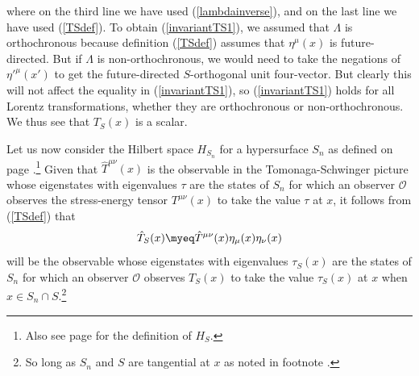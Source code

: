 \documentclass[12pt]{report}
\begin{document}
where on the third line we have used (\ref{lambdainverse}), and on the last line we have used (\ref{TSdef}). To obtain (\ref{invariantTS1}), we assumed that $\Lambda$ is orthochronous because definition (\ref{TSdef}) assumes that $\eta^\mu(x)$ is future-directed. But if $\Lambda$ is non-orthochronous, we would need to take the negations of ${\eta'}^\mu(x')$ to get the future-directed $S$-orthogonal unit four-vector. But clearly this will not affect the equality in (\ref{invariantTS1}), so (\ref{invariantTS1}) holds for all Lorentz transformations, whether they are orthochronous or non-orthochronous.  We thus see that   $T_S(x)$ is a scalar.

Let us now consider the Hilbert space $H_{S_n}$  for a hypersurface $S_n$ as defined on page \pageref{HSidef}.\footnote{Also see page \pageref{HSdef} for the definition of $H_S$.} 
Given that $\hat{T}^{\mu\nu}(x)$ is the observable in the Tomonaga-Schwinger picture whose eigenstates with eigenvalues $\tau$ are the states of $S_n$ for which an observer $\mathcal{O}$ observes the stress-energy tensor $T^{\mu\nu}(x)$ to take the value $\tau$ at $x$, it follows from (\ref{TSdef}) that 
\begin{equation}\label{TShat}
	\hat{T}_S(x)\myeq \hat{T}^{\mu\nu}(x)\eta_{\mu}(x)\eta_{\nu}(x)
	\end{equation}
will %
%
 be the observable whose eigenstates with eigenvalues $\tau_S(x)$ are the states of $S_n$ for which an observer $\mathcal{O}$ observes $T_S(x)$ to take the value $\tau_S(x)$ at $x$ when $x\in S_n\cap S$.\footnote{So long as $S_n$ and $S$ are tangential at $x$ as noted in footnote .}
\end{document}
